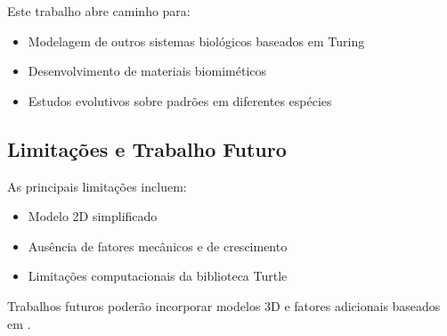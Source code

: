 \documentclass[12pt,a4paper,oneside]{extarticle}
\begin{document}
Este trabalho abre caminho para:
\begin{itemize}
    \item Modelagem de outros sistemas biológicos baseados em Turing
    \item Desenvolvimento de materiais biomiméticos
    \item Estudos evolutivos sobre padrões em diferentes espécies
\end{itemize}

\subsection{Limitações e Trabalho Futuro}

As principais limitações incluem:
\begin{itemize}
    \item Modelo 2D simplificado
    \item Ausência de fatores mecânicos e de crescimento
    \item Limitações computacionais da biblioteca Turtle
\end{itemize}

Trabalhos futuros poderão incorporar modelos 3D e fatores adicionais baseados em \cite{Economou2020, Krause2018}.

\printbibliography

\label{fim}
\end{document}
